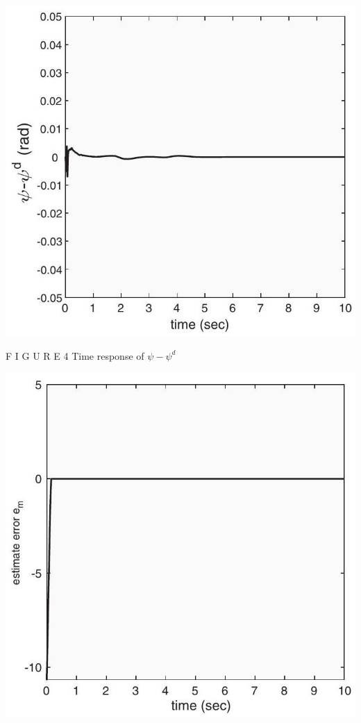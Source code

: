 \documentclass[10pt]{article}
\begin{document}
\begin{center}
\includegraphics[max width=\textwidth]{2023_10_07_eefdf58cc80a47c1244eg-11(1)}
\end{center}

F I G U R E 4 Time response of $\psi-\psi^{d}$

\begin{center}
\includegraphics[max width=\textwidth]{2023_10_07_eefdf58cc80a47c1244eg-11}
\end{center}
\end{document}
